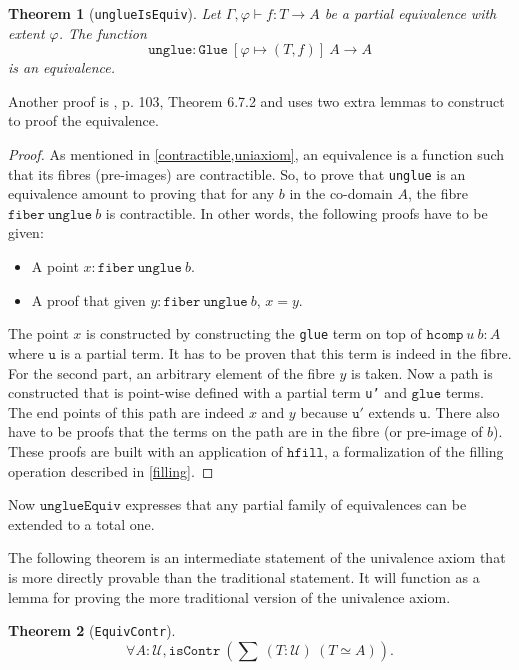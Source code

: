 \documentclass[12pt,a4paper,twoside,xetex]{book} %
\newtheorem{theorem}{Theorem}[section]
\newcommand{\op}[1]{\mathtt{#1}}
\newcommand{\type}{\mathcal{U}}
\begin{document}
\begin{theorem}[\texttt{unglueIsEquiv}]
Let $\Gamma, \varphi \vdash f : T \rightarrow A$ be a partial equivalence with 
extent $\varphi$. The function $$ \op{unglue} : \op{Glue} \ \left[\varphi 
\mapsto (T,f) \right] \ A \rightarrow A$$ is an equivalence. 
\end{theorem}

Another proof is \cite{Huber2016}, p. 103, Theorem 6.7.2 and uses two extra 
lemmas to construct to proof the equivalence.

\begin{proof}
As mentioned in \cref{contractible,uniaxiom}, an equivalence is a function such 
that its fibres (pre-images) are contractible. So, to prove that 
\texttt{unglue} is an equivalence amount to proving that for any $b$ in the 
co-domain $A$, the fibre $\op{fiber}\ \op{unglue} \ b$ is contractible. In 
other words, the following proofs have to be given:
\begin{itemize}
\item A point  $x : \op{fiber}\ \op{unglue} \ b$. 
\item A proof that given $y : \op{fiber}\ \op{unglue} \ b$, $x = y$. 
\end{itemize}
The point $x$ is constructed by constructing the \texttt{glue} term on top of 
$\texttt{hcomp} \ u \ b : A$ where $\op{u}$ is a partial term. It has to be 
proven that this term is indeed in the fibre. For the second part, an arbitrary 
element of the fibre $y$ is taken. Now a path is constructed that is point-wise 
defined with a partial term \texttt{u'} and $\op{glue}$ terms. The end points 
of this path are indeed $x$ and $y$ because $\op{u'}$ extends $\op{u}$. There 
also have to be proofs that the terms on the path are in the fibre (or 
pre-image of $b$). These proofs are built with an application of $\op{hfill}$, 
a formalization of the filling operation described in \cref{filling}.
\end{proof}

Now $\op{unglueEquiv}$  expresses that any partial family of equivalences can 
be extended to a total one.

The following theorem is an intermediate statement of the univalence axiom that 
is more directly provable than the traditional statement. It will function as a 
lemma for proving the more traditional version of the univalence axiom.

\begin{theorem}[\texttt{EquivContr}]\label{contrSingl}
 $$\forall A : \type, \op{isContr} \ \left( \sum \ (T : \type) \  \left( T 
\simeq A \right) \right).$$ 
\end{theorem}
\end{document}

